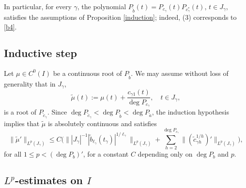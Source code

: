\documentclass[12pt]{amsart}
\theoremstyle{plain}
\theoremstyle{definition}
\numberwithin{equation}{section}
\begin{document}
In particular, for every ${\gamma}$, the polynomial $P_{\tilde b}(t) = P_{c_{\gamma}}(t) P_{c_{\gamma}^*}(t)$, $t \in J_{\gamma}$, satisfies the 
assumptions of Proposition \ref{induction}; indeed, (3) corresponds to \eqref{b4}. 

\subsection{Inductive step}

Let $\mu \in C^0(I)$ be a continuous root of $P_{\tilde b}$. 
We may assume without loss of generality that in $J_{\gamma}$, 
\begin{equation} \label{tildemu}
  \tilde \mu(t) := \mu(t) + \frac{c_{{\gamma} 1}(t)}{\deg P_{c_{\gamma}}}, \quad t \in J_{\gamma},
\end{equation}
is a root of $P_{\tilde c_{\gamma}}$. 
Since $\deg P_{\tilde c_{\gamma}} < \deg P_{\tilde b} < \deg P_{\tilde a}$, the induction hypothesis implies that
$\tilde \mu$ is absolutely continuous and satisfies 
\begin{equation} \label{mu}
    \|\tilde \mu'\|_{L^p(J_{\gamma})} \le C \Big( \| |J_{\gamma}|^{-1}  {|\tilde b_{\ell_{\gamma}}(t_{\gamma})|^{1/\ell_{\gamma}}} \|_{L^p (J_{\gamma})} 
  + \sum_{h=2}^{\deg P_{c_{\gamma}}} \|(\tilde c_{{\gamma} h}^{1/h})'\|_{L^p (J_{\gamma})}\Big),
\end{equation}
for all $1 \le p < (\deg P_b)'$, for a constant $C$ depending only on $\deg P_b$ and $p$.

\subsection{\texorpdfstring{$L^p$}{Lp}-estimates on \texorpdfstring{$I$}{I}}
\end{document}
